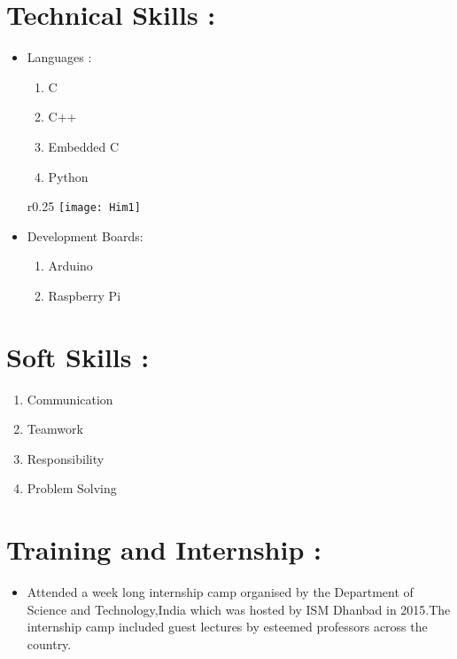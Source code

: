 \documentclass[10pt]{article} %
\begin{document}
\section*{Technical Skills :} %
\begin{itemize}

\item Languages :
\begin{enumerate}
\item C
\item C++
\item Embedded C
\item Python
\end{enumerate}

\begin{wrapfigure}{r}{0.25\textwidth} %
    \centering
    \texttt{[image: Him1]}
\end{wrapfigure}
\item Development Boards:
\begin{enumerate}
\item Arduino
\item Raspberry Pi
\end{enumerate}

\end{itemize}


\section*{Soft Skills :} %
\begin{enumerate}
\item Communication
\item Teamwork
\item Responsibility
\item Problem Solving
\end{enumerate}


\section*{Training and Internship :} %
\begin{itemize}
\item Attended a week long internship camp organised by the Department of Science and Technology,India which was hosted by ISM Dhanbad in 2015.The internship camp included guest lectures by esteemed professors across the country.
\end{itemize}
\end{document}
